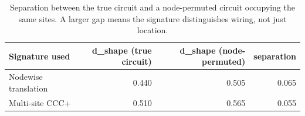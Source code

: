 \begin{table}[t]
\centering
\small
\begin{tabular}{lrrr}
\toprule
Signature used & d\_shape (true circuit) & d\_shape (node-permuted) & separation \\
\midrule
Nodewise translation & 0.440 & 0.505 & 0.065 \\
Multi-site CCC+ & 0.510 & 0.565 & 0.055 \\
\bottomrule
\end{tabular}
\caption{Separation between the true circuit and a node-permuted circuit occupying the same sites. A larger gap means the signature distinguishes wiring, not just location.}
\label{tab:multisite_separation}
\end{table}